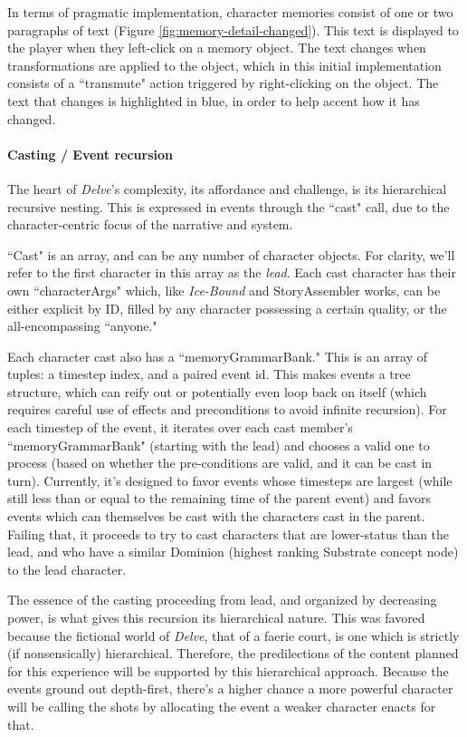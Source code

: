 
In terms of pragmatic implementation, character memories consist of one or two paragraphs of text (Figure \ref{fig:memory-detail-changed}). This text is displayed to the player when they left-click on a memory object. The text changes when transformations are applied to the object, which in this initial implementation consists of a ``transmute" action triggered by right-clicking on the object. The text that changes is highlighted in blue, in order to help accent how it has changed. 

\paragraph{Casting / Event recursion}\label{par:delve-casting-event-recursion}

The heart of \textit{Delve}'s complexity, its affordance and challenge, is its hierarchical recursive nesting. This is expressed in events through the ``cast" call, due to the character-centric focus of the narrative and system.

``Cast" is an array, and can be any number of character objects. For clarity, we'll refer to the first character in this array as the \textit{lead}. Each cast character has their own ``characterArgs" which, like \textit{Ice-Bound} and StoryAssembler works, can be either explicit by ID, filled by any character possessing a certain quality, or the all-encompassing ``anyone."

Each character cast also has a ``memoryGrammarBank." This is an array of tuples: a timestep index, and a paired event id. This makes events a tree structure, which can reify out or potentially even loop back on itself (which requires careful use of effects and preconditions to avoid infinite recursion). For each timestep of the event, it iterates over each cast member's ``memoryGrammarBank" (starting with the lead) and chooses a valid one to process (based on whether the pre-conditions are valid, and it can be cast in turn). Currently, it's designed to favor events whose timesteps are largest (while still less than or equal to the remaining time of the parent event) and favors events which can themselves be cast with the characters cast in the parent. Failing that, it proceeds to try to cast characters that are lower-status than the lead, and who have a similar Dominion (highest ranking Substrate concept node) to the lead character.

The essence of the casting proceeding from lead, and organized by decreasing power, is what gives this recursion its hierarchical nature. This was favored because the fictional world of \textit{Delve}, that of a faerie court, is one which is strictly (if nonsensically) hierarchical. Therefore, the predilections of the content planned for this experience will be supported by this hierarchical approach. Because the events ground out depth-first, there's a higher chance a more powerful character will be calling the shots by allocating the event a weaker character enacts for that. 

